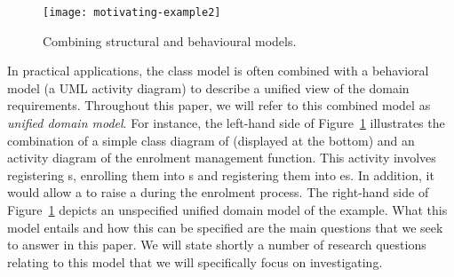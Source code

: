 \begin{figure}[th]
	\begin{center}
		\texttt{[image: motivating-example2]}
	\end{center}
	\caption{Combining structural and behavioural \courseman models.}
	\label{fig:motivatingExample2}
\end{figure}

In practical applications, the class model is often combined with a behavioral model (\eg a UML activity diagram) to describe a unified view of the domain requirements. Throughout this paper, we will refer to this combined model as \textit{unified domain model}. For instance, the left-hand side of Figure~\ref{fig:motivatingExample2} illustrates the combination of a simple class diagram of \courseman (displayed at the bottom) and an activity diagram of the enrolment management function. This activity involves registering s, enrolling them into s and registering them into es. In addition, it would allow a  to raise a  during the enrolment process. 
The right-hand side of Figure~\ref{fig:motivatingExample2} depicts an unspecified unified domain model of the \courseman example. What this model entails and how this can be specified are the main questions that we seek to answer in this paper. We will state shortly a number of research questions relating to this model that we will specifically focus on investigating.




